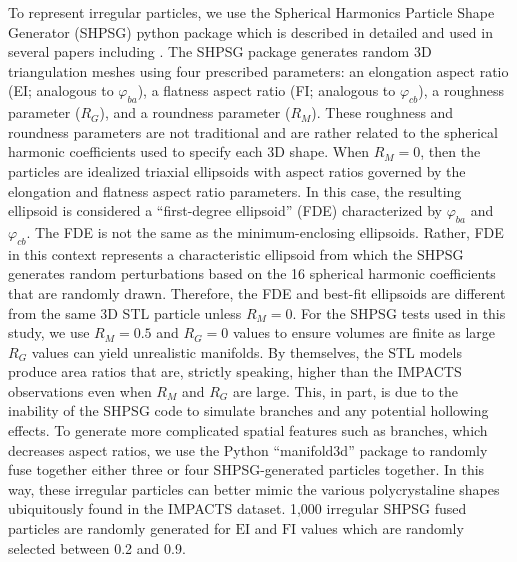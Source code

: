 \documentclass[amt, manuscript]{copernicus}
\begin{document}
To represent irregular particles, we use the Spherical Harmonics Particle Shape Generator (SHPSG) python package \citep{Zhao_SHPSG} which is described in detailed and used in several papers including \citet{Zhao2015,Zhao2017}. The SHPSG package generates random 3D triangulation meshes using four prescribed parameters: an elongation aspect ratio (EI; analogous to $\varphi_{ba}$), a flatness aspect ratio (FI; analogous to $\varphi_{cb}$), a roughness parameter ($R_{G}$), and a roundness parameter ($R_{M}$). These roughness and roundness parameters are not traditional and are rather related to the spherical harmonic coefficients used to specify each 3D shape. When $R_{M}=0$, then the particles are idealized triaxial ellipsoids with aspect ratios governed by the elongation and flatness aspect ratio parameters. In this case, the resulting ellipsoid is considered a ``first-degree ellipsoid'' (FDE) characterized by $\varphi_{ba}$ and $\varphi_{cb}$. The FDE is not the same as the minimum-enclosing ellipsoids. Rather, FDE in this context represents a characteristic ellipsoid from which the SHPSG generates random perturbations based on the 16 spherical harmonic coefficients that are randomly drawn. Therefore, the FDE and best-fit ellipsoids are different from the same 3D STL particle unless $R_{M}=0$. For the SHPSG tests used in this study, we use $R_{M}=0.5$ and $R_{G}=0$ values to ensure volumes are finite as large $R_{G}$ values can yield unrealistic manifolds. By themselves, the STL models produce area ratios that are, strictly speaking, higher than the IMPACTS observations even when $R_{M}$ and $R_{G}$ are large. This, in part, is due to the inability of the SHPSG code to simulate branches and any potential hollowing effects. To generate more complicated spatial features such as branches, which decreases aspect ratios, we use the Python ``manifold3d'' package \citep{Manifold3d2026} to randomly fuse together either three or four SHPSG-generated particles together. In this way, these irregular particles can better mimic the various polycrystaline shapes ubiquitously found in the IMPACTS dataset. 1,000 irregular SHPSG fused particles are randomly generated for $\mathrm{EI}$ and $\mathrm{FI}$ values which are randomly selected between 0.2 and 0.9.


\end{document}
